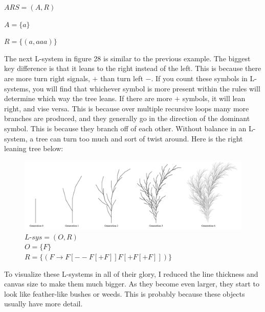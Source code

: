 \documentclass{article}
\begin{document}
\medskip
  $ARS = (A, R)$
  
\smallskip
  $A = \{a\}$
  
\smallskip
  $R = \{(a, aaa)\}$

\medskip\noindent
The next L-system in figure 28 is similar to the previous example. The biggest key difference is that it leans to the right instead of the left. This is because there are more turn right signals, $+$ than turn left $-$. If you count these symbols in L-systems, you will find that whichever symbol is more present within the rules will determine which way the tree leans. If there are more $+$ symbols, it will lean right, and vise versa. This is because over multiple recursive loops many more branches are produced, and they generally go in the direction of the dominant symbol. This is because they branch off of each other. Without balance in an L-system, a tree can turn too much and sort of twist around. Here is the right leaning tree below:

\begin{figure}[H]
  \centering
  \includegraphics[scale=.265]{treeCs.PNG}
  \caption[] {
    $L$-$sys = (O, R)$
    \\ $O = \{ F \}$
    \\ $R = \{ (F \rightarrow F[--F[+F]]F[+F[+F]]) \}$
    \endtabular}
\end{figure}

\medskip\noindent
To visualize these L-systems in all of their glory, I reduced the line thickness and canvas size to make them much bigger. As they become even larger, they start to look like feather-like bushes or weeds. This is probably because these objects usually have more detail.
\end{document}
